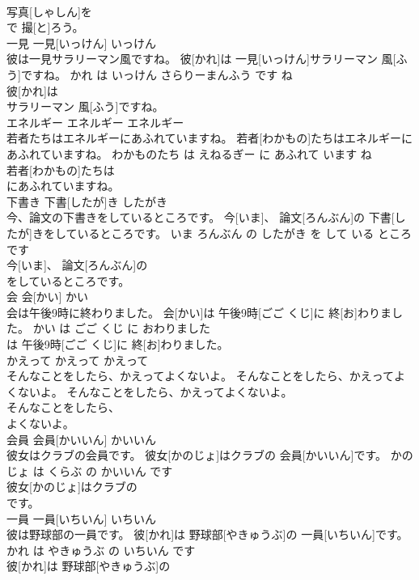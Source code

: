 \documentclass[8pt]{extreport}
\begin{document}
\begin{CJK}{UTF8}{min}
\\	写真[しゃしん]を
\\	で 撮[と]ろう。			
\\	一見	一見[いっけん]	いっけん	
\\	彼は一見サラリーマン風ですね。	彼[かれ]は 一見[いっけん]サラリーマン 風[ふう]ですね。	かれ は いっけん さらりーまんふう です ね	
\\	彼[かれ]は
\\	サラリーマン 風[ふう]ですね。			
\\	エネルギー	エネルギー	エネルギー	
\\	若者たちはエネルギーにあふれていますね。	若者[わかもの]たちはエネルギーにあふれていますね。	わかものたち は えねるぎー に あふれて います ね	
\\	若者[わかもの]たちは
\\	にあふれていますね。			
\\	下書き	下書[したが]き	したがき	
\\	今、論文の下書きをしているところです。	今[いま]、 論文[ろんぶん]の 下書[したが]きをしているところです。	いま ろんぶん の したがき を して いる ところ です	
\\	今[いま]、 論文[ろんぶん]の
\\	をしているところです。			
\\	会	会[かい]	かい	
\\	会は午後9時に終わりました。	会[かい]は 午後9時[ごご くじ]に 終[お]わりました。	かい は ごご くじ に おわりました	
\\	は 午後9時[ごご くじ]に 終[お]わりました。			
\\	かえって	かえって	かえって	
\\	そんなことをしたら、かえってよくないよ。	そんなことをしたら、かえってよくないよ。	そんなことをしたら、かえってよくないよ。	
\\	そんなことをしたら、
\\	よくないよ。			
\\	会員	会員[かいいん]	かいいん	
\\	彼女はクラブの会員です。	彼女[かのじょ]はクラブの 会員[かいいん]です。	かのじょ は くらぶ の かいいん です	
\\	彼女[かのじょ]はクラブの
\\	です。			
\\	一員	一員[いちいん]	いちいん	
\\	彼は野球部の一員です。	彼[かれ]は 野球部[やきゅうぶ]の 一員[いちいん]です。	かれ は やきゅうぶ の いちいん です	
\\	彼[かれ]は 野球部[やきゅうぶ]の

\end{CJK}
\end{document}

